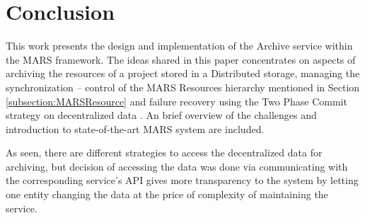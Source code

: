 \chapter{Conclusion}
This work presents the design and implementation of the Archive service within the MARS framework. The ideas shared
in this paper concentrates on aspects of archiving the resources of a project stored in a Distributed storage, managing the synchronization
-- control of the MARS Resources hierarchy mentioned in Section \ref{subsection:MARSResource} and failure recovery using the Two Phase Commit strategy
on decentralized data \cite{atomic}.
An brief overview of the challenges and introduction to state-of-the-art MARS system are included.

As seen, there are different strategies to access the decentralized data for archiving, but decision of accessing the data was done via communicating
with the corresponding service's API gives more transparency to the system by letting one entity changing the data at the price of complexity of maintaining 
the service.

